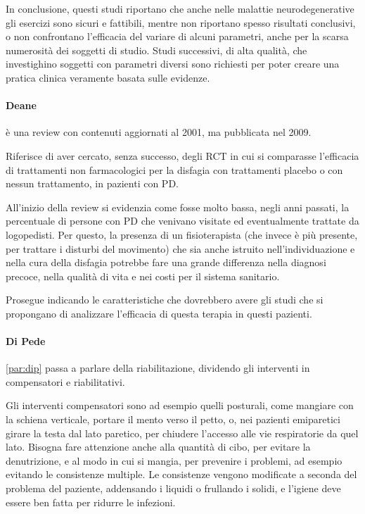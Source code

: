 In conclusione, questi studi riportano che anche nelle malattie 
neurodegenerative gli esercizi sono sicuri e fattibili, mentre non riportano 
spesso risultati conclusivi, o non confrontano l'efficacia del variare di 
alcuni parametri, anche per la scarsa numerosità dei soggetti di studio.
Studi successivi, di alta qualità, che investighino soggetti con parametri 
diversi sono richiesti per poter creare una pratica clinica veramente basata 
sulle evidenze.

\paragraph{Deane} \label{par:dea} \cite{Deane2001} è una review con contenuti 
aggiornati al 2001, ma pubblicata nel 2009.

Riferisce di aver cercato, senza successo, degli RCT in cui si comparasse 
l'efficacia di trattamenti non farmacologici per la disfagia con trattamenti 
placebo o con nessun trattamento, in pazienti con PD.

All'inizio della review si evidenzia come fosse molto bassa, negli anni 
passati, la percentuale di persone con PD che venivano visitate ed 
eventualmente trattate da logopedisti.
Per questo, la presenza di un fisioterapista (che invece è più presente, per 
trattare i disturbi del movimento) che sia anche istruito nell'individuazione e 
nella cura della disfagia potrebbe fare una grande differenza nella diagnosi 
precoce, nella qualità di vita e nei costi per il sistema sanitario.

Prosegue indicando le caratteristiche che dovrebbero avere gli studi che si 
propongano di analizzare l'efficacia di questa terapia in questi pazienti.

\paragraph{Di Pede} \ref{par:dip} \cite{DiPede2015} passa a parlare della 
riabilitazione, dividendo gli interventi in compensatori e riabilitativi.

Gli interventi compensatori sono ad esempio quelli posturali, come mangiare con 
la schiena verticale, portare il mento verso il petto, o, nei pazienti 
emiparetici girare la testa dal lato paretico, per chiudere l'accesso alle vie 
respiratorie da quel lato.
Bisogna fare attenzione anche alla quantità di cibo, per evitare la 
denutrizione, e al modo in cui si mangia, per prevenire i problemi, ad esempio 
evitando le consistenze multiple.
Le consistenze vengono modificate a seconda del problema del paziente, 
addensando i liquidi o frullando i solidi, e l'igiene deve essere ben fatta per 
ridurre le infezioni.

